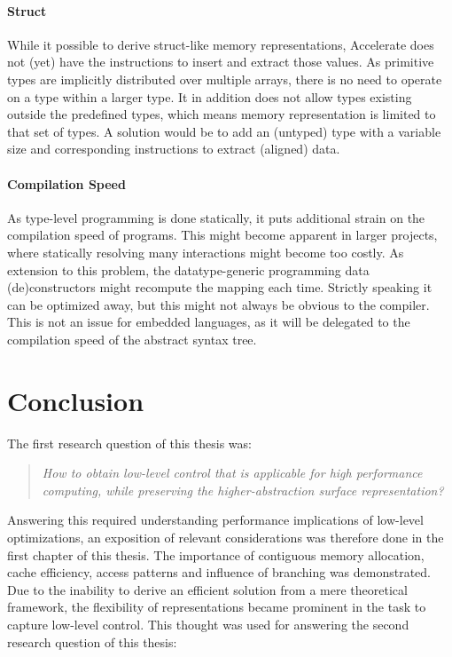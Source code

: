 \documentclass{article}
\begin{document}
\paragraph{Struct}

While it possible to derive struct-like memory representations, Accelerate does not (yet) have the instructions to insert and extract those values.
As primitive types are implicitly distributed over multiple arrays, there is no need to operate on a type within a larger type. 
It in addition does not allow types existing outside the predefined types, which means memory representation is limited to that set of types.
A solution would be to add an (untyped) type with a variable size and corresponding instructions to extract (aligned) data.

\paragraph{Compilation Speed}

As type-level programming is done statically, it puts additional strain on the compilation speed of programs.
This might become apparent in larger projects, where statically resolving many interactions might become too costly.
As extension to this problem, the datatype-generic programming data (de)constructors might recompute the mapping each time.
Strictly speaking it can be optimized away, but this might not always be obvious to the compiler. 
This is not an issue for embedded languages, as it will be delegated to the compilation speed of the abstract syntax tree. 

\newpage

\section{Conclusion}

The first research question of this thesis was:

\begin{quote}
{\it How to obtain low-level control that is applicable for high performance computing, while preserving the higher-abstraction surface representation?}
\end{quote}

Answering this required understanding performance implications of low-level optimizations, an exposition of relevant considerations was therefore done in the first chapter of this thesis.
The importance of contiguous memory allocation, cache efficiency, access patterns and influence of branching was demonstrated.
Due to the inability to derive an efficient solution from a mere theoretical framework, the flexibility of representations became prominent in the task to capture low-level control.  
This thought was used for answering the second research question of this thesis:
\end{document}
